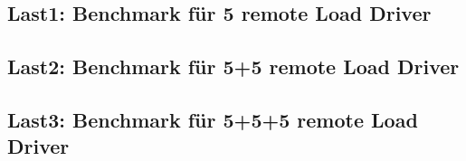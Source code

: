 \subsection{Last1: Benchmark für 5 remote Load Driver}\label{subsec:benchmark-5-remote-load-driver}

\subsection{Last2: Benchmark für 5+5 remote Load Driver}\label{subsec:benchmark-5-5-remote-load-driver}

\subsection{Last3: Benchmark für 5+5+5 remote Load Driver}\label{subsec:benchmark-5-5-5-remote-load-driver}